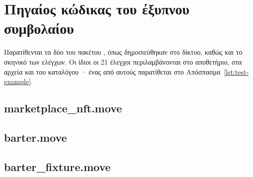 \chapter{Πηγαίος κώδικας του έξυπνου συμβολαίου}
\label{app:move}
Παρατίθενται τα δύο  του πακέτου , όπως δημοσιεύθηκαν στο
δίκτυο, καθώς και το σκηνικό των ελέγχων. Οι ίδιοι οι 21 έλεγχοι περιλαμβάνονται στο
αποθετήριο, στα αρχεία  και
 του καταλόγου · ένας από αυτούς
παρατίθεται στο Απόσπασμα~\ref{lst:test-example}.

\section{marketplace\_nft.move}


\section{barter.move}


\section{barter\_fixture.move}


